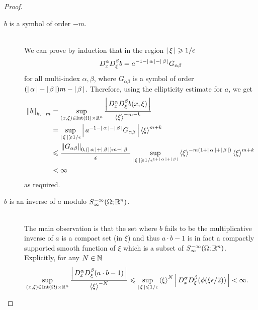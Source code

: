 \documentclass[12pt]{article}
\begin{document}
\begin{proof}
\begin{description}
        \item[$b$ is a symbol of order $-m$.  ] \hfill \\
        We can prove by induction that in the region $\abs{\xi} \geq 1/ \epsilon$
        \begin{align*}
        D^\alpha_x D^\beta_\xi b = a^{-1 - \abs{\alpha} - \abs{\beta}} G_{\alpha \beta}
        \end{align*}
        for all multi-index $\alpha, \beta$, where $G_{\alpha \beta}$ is a symbol of order $(\abs{\alpha} + \abs{\beta})m  - \abs{\beta}$. Therefore, using the ellipticity estimate for $a$, we get 
        \begin{align*}
        \norm[b]_{k, -m} 
        & = \sup_{(x, \xi) \in \mathrm{Int}(\Omega) \times \R^n} \frac{\abs{D^\alpha_x D^\beta_\xi b(x, \xi)}}{\sym[\xi]^{-m-k}} \\
        &= \sup_{\abs{\xi} \geq 1/\epsilon} \abs{a^{-1 - \abs{\alpha} - \abs{\beta}} G_{\alpha \beta}} \sym[\xi]^{m + k} \\
        &\leq \frac{\norm[G_{\alpha \beta}]_{0, (\abs{\alpha} + \abs{\beta})m - \abs{\beta}}}{\epsilon} \sup_{\abs{\xi} \geq 1/\epsilon^{1 + \abs{\alpha} + \abs{\beta}}} \sym[\xi]^{-m(1 + \abs{\alpha} + \abs{\beta})} \sym[\xi]^{m + k}\\
        & < \infty
        \end{align*}
        as required. 
        
        \item[$b$ is an inverse of $a$ modulo $ S^{-\infty}_\infty(\Omega; \R^n)$. ] \hfill \\
        The main observation is that the set where $b$ fails to be the multiplicative inverse of $a$ is a compact set (in $\xi$) and thus $a \cdot b - 1$ is in fact a compactly supported smooth function of $\xi$ which is a subset of $S^{-\infty}_\infty(\Omega; \R^n)$.  Explicitly, for any $N \in \N$
        \begin{align*}
        \sup_{(x, \xi) \in \mathrm{Int}(\Omega) \times \R^n} \frac{\abs{D^\alpha_x D^\beta_\xi (a\cdot b - 1)} }{\sym[\xi]^{-N}}
        &\leq \sup_{\abs{\xi} \leq 1/ \epsilon} \sym[\xi]^N \abs{D^\alpha_x D^\beta_\xi (\phi(\xi \epsilon / 2))} < \infty.  
        \end{align*}
    \end{description}\end{proof}
\end{document}
